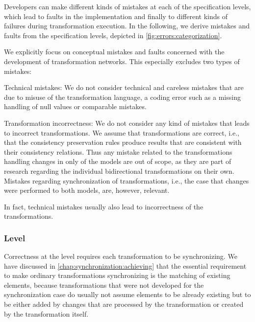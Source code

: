 
Developers can make different kinds of mistakes at each of the specification levels, which lead to faults in the implementation and finally to different kinds of failures during transformation execution.
In the following, we derive mistakes and faults from the specification levels, depicted in \autoref{fig:errors:categorization}.

We explicitly focus on conceptual mistakes and faults concerned with the development of transformation networks.
This especially excludes two types of mistakes:
\begin{properdescription}
    \item[Technical mistakes:] We do not consider technical and careless mistakes that are due to misuse of the transformation language, a coding error such as a missing handling of null values or comparable mistakes.
    \item[Transformation incorrectness:] We do not consider any kind of mistakes that leads to incorrect transformations. We assume that transformations are correct, i.e., that the consistency preservation rules produce results that are consistent with their consistency relations. Thus any mistake related to the transformations handling changes in only of the models are out of scope, as they are part of research regarding the individual bidirectional transformations on their own. Mistakes regarding synchronization of transformations, i.e., the case that changes were performed to both models, are, however, relevant.
\end{properdescription}
In fact, technical mistakes usually also lead to incorrectness of the transformations.


\subsubsection*{\LevelTransformation Level}

Correctness at the \leveltransformation level requires each transformation to be synchronizing.
We have discussed in \autoref{chap:synchronization:achieving} that the essential requirement to make ordinary transformations synchronizing is the matching of existing elements, because transformations that were not developed for the synchronization case do usually not assume elements to be already existing but to be either added by changes that are processed by the transformation or created by the transformation itself.

